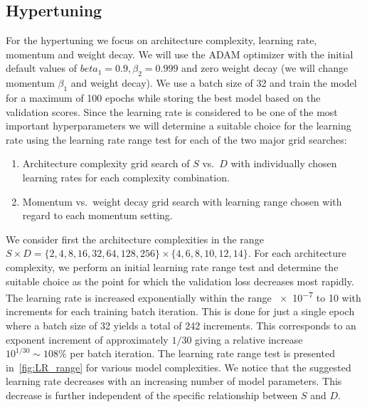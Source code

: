 \subsection{Hypertuning}
For the hypertuning we focus on architecture complexity, learning rate, momentum and weight decay. We will use the ADAM optimizer with the initial default values of $beta_1 = 0.9, \beta_2 = 0.999$ and zero weight decay (we will change momentum $\beta_1$ and weight decay). We use a batch size of 32 and train the model for a maximum of 100 epochs while storing the best model based on the validation scores.
Since the learning rate is considered to be one of the most important hyperparameters we will determine a suitable choice for the learning rate using the learning rate range test for each of the two major grid searches:
\begin{enumerate}
  \item Architecture complexity grid search of $S$ vs.\ $D$ with individually chosen learning rates for each complexity combination.
  \item Momentum vs.\ weight decay grid search with learning range chosen with regard to each momentum setting.
\end{enumerate}
We consider first the architecture complexities in the range $S \times D =
\{2,4,8,16,32,64,128,256\} \times \{4,6,8,10,12,14\}$. For each architecture
complexity, we perform an initial learning rate range test and determine the suitable choice as the point for which the validation loss decreases most rapidly. The learning rate is increased exponentially within the range \num{e-7} to 10 with increments for each training batch iteration. This is done for just a single epoch where a batch size of 32 yields a total of 242 increments. This corresponds to an exponent increment of approximately $1/30$ giving a relative increase $10^{1/30} \sim 108\%$ per batch iteration. The learning rate range test is presented in~\cref{fig:LR_range} for various model complexities. We notice that the suggested learning rate decreases with an increasing number of model parameters. This decrease is further independent of the specific relationship between $S$ and $D$.


